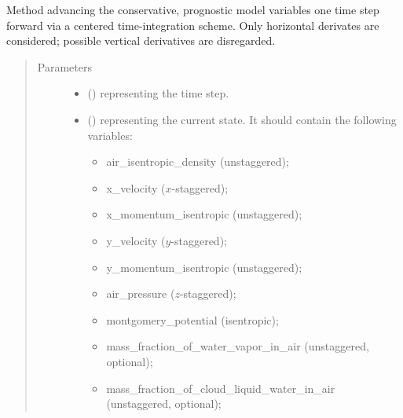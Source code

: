 \documentclass[letterpaper,10pt,english]{sphinxmanual}
\begin{document}
\begin{fulllineitems}
\begin{fulllineitems}
\label{\detokenize{api:dycore.prognostic_isentropic_centered.PrognosticIsentropicCentered.step_neglecting_vertical_advection}}
Method advancing the conservative, prognostic model variables one time step forward via a centered time-integration scheme.
Only horizontal derivates are considered; possible vertical derivatives are disregarded.
\begin{quote}\begin{description}
\item[{Parameters}] \leavevmode\begin{itemize}
\item {} 
 () \textendash{}  representing the time step.

\item {} 
 () \textendash{} 
{\hyperref[\detokenize{api:storages.state_isentropic.StateIsentropic}]{}} representing the current state.
It should contain the following variables:
\begin{itemize}
\item {} 
air\_isentropic\_density (unstaggered);

\item {} 
x\_velocity (\(x\)-staggered);

\item {} 
x\_momentum\_isentropic (unstaggered);

\item {} 
y\_velocity (\(y\)-staggered);

\item {} 
y\_momentum\_isentropic (unstaggered);

\item {} 
air\_pressure (\(z\)-staggered);

\item {} 
montgomery\_potential (isentropic);

\item {} 
mass\_fraction\_of\_water\_vapor\_in\_air (unstaggered, optional);

\item {} 
mass\_fraction\_of\_cloud\_liquid\_water\_in\_air (unstaggered, optional);


\end{itemize}
\end{itemize}
\end{description}
\end{quote}
\end{fulllineitems}
\end{fulllineitems}
\end{document}
